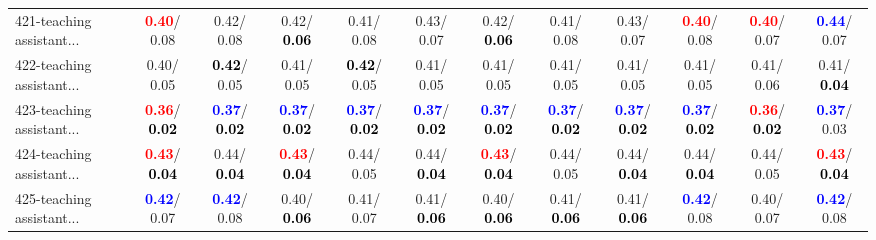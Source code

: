 \begin{table}[h]
\begin{center}
{\begin{tabular}{lc|c|c|c|c|c|c|c|c|c|c}
421-teaching assistant... & \textcolor{red}{\textbf{  0.40}}/  0.08 &   0.42/  0.08 &   0.42/\textcolor{black}{\textbf{  0.06}} &   0.41/  0.08 &   0.43/  0.07 &   0.42/\textcolor{black}{\textbf{  0.06}} &   0.41/  0.08 &   0.43/  0.07 & \textcolor{red}{\textbf{  0.40}}/  0.08 & \textcolor{red}{\textbf{  0.40}}/  0.07 & \textcolor{blue}{\textbf{  0.44}}/  0.07 \\
422-teaching assistant... &   0.40/  0.05 & \textcolor{black}{\textbf{  0.42}}/  0.05 &   0.41/  0.05 & \textcolor{black}{\textbf{  0.42}}/  0.05 &   0.41/  0.05 &   0.41/  0.05 &   0.41/  0.05 &   0.41/  0.05 &   0.41/  0.05 &   0.41/  0.06 &   0.41/\textcolor{black}{\textbf{  0.04}} \\
423-teaching assistant... & \textcolor{red}{\textbf{  0.36}}/\textcolor{black}{\textbf{  0.02}} & \textcolor{blue}{\textbf{  0.37}}/\textcolor{black}{\textbf{  0.02}} & \textcolor{blue}{\textbf{  0.37}}/\textcolor{black}{\textbf{  0.02}} & \textcolor{blue}{\textbf{  0.37}}/\textcolor{black}{\textbf{  0.02}} & \textcolor{blue}{\textbf{  0.37}}/\textcolor{black}{\textbf{  0.02}} & \textcolor{blue}{\textbf{  0.37}}/\textcolor{black}{\textbf{  0.02}} & \textcolor{blue}{\textbf{  0.37}}/\textcolor{black}{\textbf{  0.02}} & \textcolor{blue}{\textbf{  0.37}}/\textcolor{black}{\textbf{  0.02}} & \textcolor{blue}{\textbf{  0.37}}/\textcolor{black}{\textbf{  0.02}} & \textcolor{red}{\textbf{  0.36}}/\textcolor{black}{\textbf{  0.02}} & \textcolor{blue}{\textbf{  0.37}}/  0.03 \\ \hline
424-teaching assistant... & \textcolor{red}{\textbf{  0.43}}/\textcolor{black}{\textbf{  0.04}} &   0.44/\textcolor{black}{\textbf{  0.04}} & \textcolor{red}{\textbf{  0.43}}/\textcolor{black}{\textbf{  0.04}} &   0.44/  0.05 &   0.44/\textcolor{black}{\textbf{  0.04}} & \textcolor{red}{\textbf{  0.43}}/\textcolor{black}{\textbf{  0.04}} &   0.44/  0.05 &   0.44/\textcolor{black}{\textbf{  0.04}} &   0.44/\textcolor{black}{\textbf{  0.04}} &   0.44/  0.05 & \textcolor{red}{\textbf{  0.43}}/\textcolor{black}{\textbf{  0.04}} \\
425-teaching assistant... & \textcolor{blue}{\textbf{  0.42}}/  0.07 & \textcolor{blue}{\textbf{  0.42}}/  0.08 &   0.40/\textcolor{black}{\textbf{  0.06}} &   0.41/  0.07 &   0.41/\textcolor{black}{\textbf{  0.06}} &   0.40/\textcolor{black}{\textbf{  0.06}} &   0.41/\textcolor{black}{\textbf{  0.06}} &   0.41/\textcolor{black}{\textbf{  0.06}} & \textcolor{blue}{\textbf{  0.42}}/  0.08 &   0.40/  0.07 & \textcolor{blue}{\textbf{  0.42}}/  0.08 \\

\end{tabular}}
\end{center}
\end{table}
